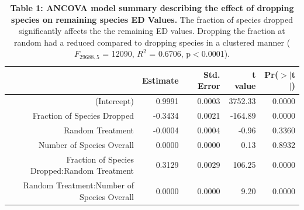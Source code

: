 \documentclass[12pt,english]{article}
\begin{document}
\begin{table}[ht]
  \centering
  \begin{tabular}{rrrrr}
    \hline
    & Estimate & Std. Error & t value & Pr($>$$|$t$|$) \\
    \hline
    (Intercept) & 0.9991 & 0.0003 & 3752.33 & 0.0000 \\
    Fraction of Species Dropped & -0.3434 & 0.0021 & -164.89 & 0.0000 \\
    Random Treatment & -0.0004 & 0.0004 & -0.96 & 0.3360 \\
    Number of Species Overall & 0.0000 & 0.0000 & 0.13 & 0.8932 \\
    Fraction of Species Dropped:Random Treatment & 0.3129 & 0.0029 & 106.25 & 0.0000 \\
    Random Treatment:Number of Species Overall & 0.0000 & 0.0000 & 9.20 & 0.0000 \\
    \hline
    \hline
  \end{tabular}
  \caption*{\textbf{Table 1: ANCOVA model summary describing the effect of 
      dropping species on remaining species ED Values.} The fraction of species 
    dropped significantly affects the the remaining ED values. Dropping the 
    fraction at random had a reduced compared to dropping species in a clustered 
    manner ($F_{29688, 5}$ = 12090, $R^{2}$ = 0.6706, p$<$0.0001).}
\end{table}

\end{document}

